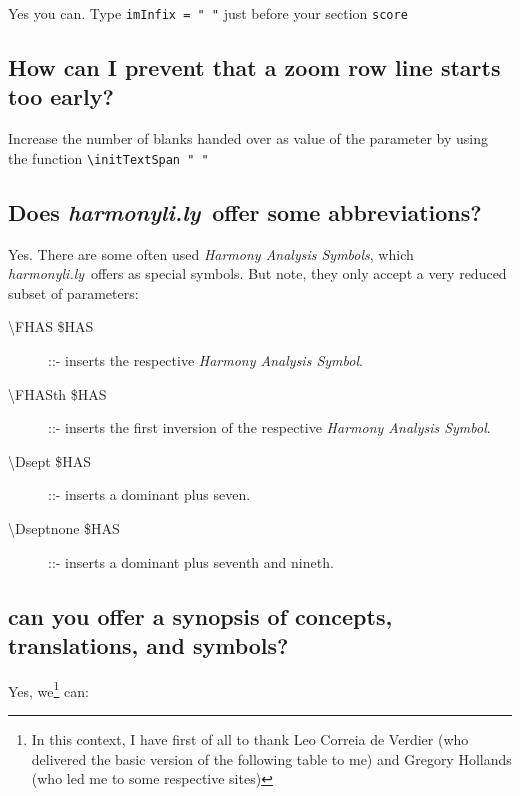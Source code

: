 \documentclass[
  DIV=calc,
  BCOR=5mm,
  12pt,
  headings=small,
  oneside,
  abstract=true,
  toc=bib,
  xcolor=dvipsnames,
  openany,
  ngerman,english]{scrartcl}
\newcommand{\hlyn}[0]{\textit{harmonyli.ly}}
\newcommand{\has}[1]{\textit{Harmony Analysis Symbol#1}}
\begin{document}
Yes you can. Type \texttt{imInfix = " "} just before your section \texttt{score}

\subsection{How can I prevent that a zoom row line starts too early?}

Increase the number of blanks handed over as value of the parameter by using the
function \texttt{\textbackslash initTextSpan "      "}

\subsection{Does \hlyn\ offer some abbreviations?}

Yes. There are some often used \has{s}, which \hlyn\ offers as special symbols.
But note, they only accept a very reduced subset of parameters:

\begin{description}
  \item[\textbackslash FHAS \$HAS] ::- inserts the respective \has{}.
  \item[\textbackslash FHASth \$HAS] ::- inserts the first inversion of the respective \has{}.
  \item[\textbackslash Dsept \$HAS] ::- inserts a dominant plus seven.
  \item[\textbackslash Dseptnone \$HAS] ::- inserts a dominant plus seventh and nineth.
\end{description}

\subsection{can you offer a synopsis of concepts, translations, and symbols?}

Yes, we\footnote{In this context, I have first of all to thank Leo Correia de
Verdier (who delivered the basic version of the following table to me) and
Gregory Hollands (who led me to some respective sites)} can:
\end{document}
